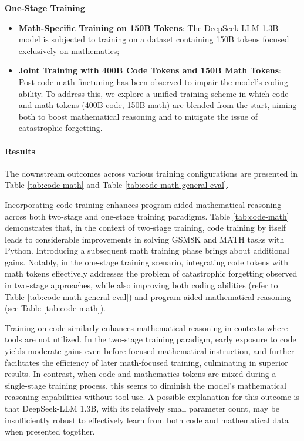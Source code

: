 \begin{itemize}[topsep=0pt]
\begin{itemize}[topsep=0pt]
\textbf{One-Stage Training}

\begin{itemize}[topsep=0pt]
    \item \textbf{Math-Specific Training on 150B Tokens}: The DeepSeek-LLM 1.3B model is subjected to training on a dataset containing 150B tokens focused exclusively on mathematics;
    \item \textbf{Joint Training with 400B Code Tokens and 150B Math Tokens}: Post-code math finetuning has been observed to impair the model’s coding ability. To address this, we explore a unified training scheme in which code and math tokens (400B code, 150B math) are blended from the start, aiming both to boost mathematical reasoning and to mitigate the issue of catastrophic forgetting.
\end{itemize}

\paragraph{Results}
The downstream outcomes across various training configurations are presented in Table \ref{tab:code-math} and Table \ref{tab:code-math-general-eval}.

Incorporating code training enhances program-aided mathematical reasoning across both two-stage and one-stage training paradigms. Table \ref{tab:code-math} demonstrates that, in the context of two-stage training, code training by itself leads to considerable improvements in solving GSM8K and MATH tasks with Python. Introducing a subsequent math training phase brings about additional gains. Notably, in the one-stage training scenario, integrating code tokens with math tokens effectively addresses the problem of catastrophic forgetting observed in two-stage approaches, while also improving both coding abilities (refer to Table \ref{tab:code-math-general-eval}) and program-aided mathematical reasoning (see Table \ref{tab:code-math}).

Training on code similarly enhances mathematical reasoning in contexts where tools are not utilized. In the two-stage training paradigm, early exposure to code yields moderate gains even before focused mathematical instruction, and further facilitates the efficiency of later math-focused training, culminating in superior results. In contrast, when code and mathematics tokens are mixed during a single-stage training process, this seems to diminish the model’s mathematical reasoning capabilities without tool use. A possible explanation for this outcome is that DeepSeek-LLM 1.3B, with its relatively small parameter count, may be insufficiently robust to effectively learn from both code and mathematical data when presented together.


\end{itemize}
\end{itemize}
